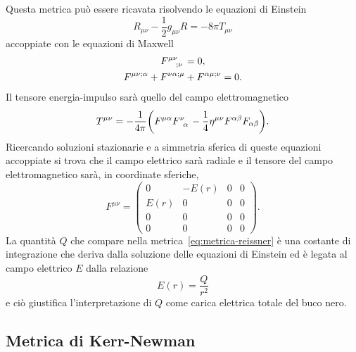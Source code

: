 Questa metrica può essere ricavata risolvendo le equazioni di
Einstein
\begin{equation}
  R_{\mu\nu} - \frac{1}{2}g_{\mu\nu}R = -8\pi T_{\mu\nu}
\end{equation}
accoppiate con le equazioni di Maxwell
\begin{subequations}
  \begin{gather}
    \tensor{F}{^{\mu\nu}_{;\nu}} = 0, \\
    F^{\mu\nu;\alpha} + F^{\nu\alpha;\mu} + F^{\alpha\mu;\nu} = 0.
  \end{gather}
\end{subequations}
Il tensore energia-impulso sarà quello del campo elettromagnetico
\begin{equation}
  T^{\mu\nu} = -\frac{1}{4\pi}\biggl(F^{\mu\alpha}\tensor{F}{^{\nu}_{\alpha}} -
  \frac{1}{4}\eta^{\mu\nu}F^{\alpha\beta}F_{\alpha\beta}\biggr).
\end{equation}
Ricercando soluzioni stazionarie e a simmetria sferica di queste equazioni
accoppiate si trova che il campo elettrico sarà radiale e il tensore del campo
elettromagnetico sarà, in coordinate sferiche,
\begin{equation}
  F^{\mu\nu} =
  \begin{pmatrix}
    0 & -E(r) & 0 & 0 \\
    E(r) & 0 & 0 & 0 \\
    0 & 0 & 0 & 0 \\
    0 & 0 & 0 & 0
  \end{pmatrix}.
\end{equation}
La quantità \(Q\) che compare nella metrica~\eqref{eq:metrica-reissner} è una
costante di integrazione che deriva dalla soluzione delle equazioni di Einstein
ed è legata al campo elettrico \(E\) dalla relazione
\begin{equation}
  E(r) = \frac{Q}{r^{2}}
\end{equation}
e ciò giustifica l'interpretazione di \(Q\) come carica elettrica totale del
buco nero.

\subsection{Metrica di Kerr-Newman}
\label{sec:metrica-kerr-newman}

